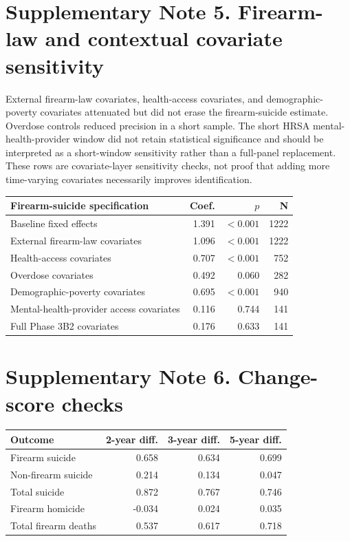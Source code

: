 \documentclass[10pt]{article}
\begin{document}
\section*{Supplementary Note 5. Firearm-law and contextual covariate sensitivity}

External firearm-law covariates, health-access covariates, and demographic-poverty covariates attenuated but did not erase the firearm-suicide estimate. Overdose controls reduced precision in a short sample. The short HRSA mental-health-provider window did not retain statistical significance and should be interpreted as a short-window sensitivity rather than a full-panel replacement. These rows are covariate-layer sensitivity checks, not proof that adding more time-varying covariates necessarily improves identification.

\begin{center}
\begin{tabular}{lrrr}
\toprule
Firearm-suicide specification & Coef. & $p$ & N \\
\midrule
Baseline fixed effects & 1.391 & $<0.001$ & 1222 \\
External firearm-law covariates & 1.096 & $<0.001$ & 1222 \\
Health-access covariates & 0.707 & $<0.001$ & 752 \\
Overdose covariates & 0.492 & 0.060 & 282 \\
Demographic-poverty covariates & 0.695 & $<0.001$ & 940 \\
Mental-health-provider access covariates & 0.116 & 0.744 & 141 \\
Full Phase 3B2 covariates & 0.176 & 0.633 & 141 \\
\bottomrule
\end{tabular}
\end{center}

\section*{Supplementary Note 6. Change-score checks}

\begin{center}
\begin{tabular}{lrrr}
\toprule
Outcome & 2-year diff. & 3-year diff. & 5-year diff. \\
\midrule
Firearm suicide & 0.658 & 0.634 & 0.699 \\
Non-firearm suicide & 0.214 & 0.134 & 0.047 \\
Total suicide & 0.872 & 0.767 & 0.746 \\
Firearm homicide & -0.034 & 0.024 & 0.035 \\
Total firearm deaths & 0.537 & 0.617 & 0.718 \\
\bottomrule
\end{tabular}
\end{center}
\end{document}
